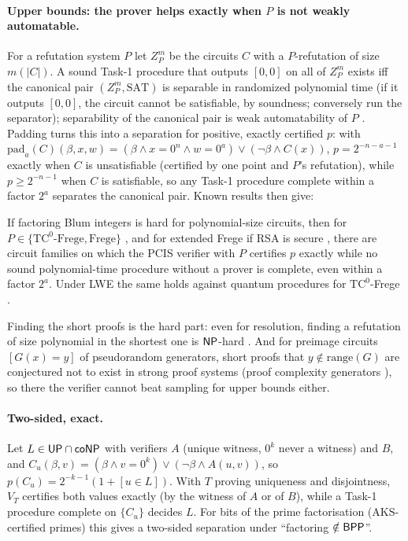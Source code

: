 \paragraph{Upper bounds: the prover helps exactly when $P$ is not weakly
automatable.} For a refutation system $P$ let $Z_P^m$ be the circuits $C$ with
a $P$-refutation of size $m(|C|)$. A sound Task-1 procedure that outputs
$[0,0]$ on all of $Z_P^m$ exists iff the canonical pair $(Z_P^m,\mathrm{SAT})$ is
separable in randomized polynomial time (if it outputs $[0,0]$, the circuit
cannot be satisfiable, by soundness; conversely run the separator); separability of
the canonical pair is weak automatability of $P$ \cite{pudlak2003pairs}. Padding
turns this into a separation for positive, exactly certified $p$: with
$\mathrm{pad}_a(C)(\beta,x,w)=(\beta\wedge x=0^n\wedge w=0^a)\vee(\neg\beta\wedge
C(x))$, $p=2^{-n-a-1}$ exactly when $C$ is unsatisfiable (certified by one point
and $P$'s refutation), while $p\ge2^{-n-1}$ when $C$ is satisfiable, so any Task-1
procedure complete within a factor $2^a$ separates the canonical pair. Known
results then give:

\begin{corollary}\label{cor:automatability}
If factoring Blum integers is hard for polynomial-size circuits, then for
$P\in\{\mathrm{TC}^0\text{-Frege},\text{Frege}\}$ \cite{bpr2000}, and for
extended Frege if RSA is secure \cite{kp1998}, there are circuit families on
which the PCIS verifier with $P$ certifies $p$ exactly while no sound
polynomial-time procedure without a prover is complete, even within a factor
$2^a$. Under LWE the same holds against quantum procedures for
$\mathrm{TC}^0$-Frege \cite{acg2024}.
\end{corollary}

Finding the short proofs is the hard part: even for resolution, finding a
refutation of size polynomial in the shortest one is $\mathsf{NP}$-hard
\cite{atserias2020automating}. And for preimage circuits $[G(x)=y]$ of
pseudorandom generators, short proofs that $y\notin\mathrm{range}(G)$ are
conjectured not to exist in strong proof systems (proof complexity generators
\cite{abrw2004,krajicek2004dual}), so there the verifier cannot beat sampling for
upper bounds either.

\paragraph{Two-sided, exact.} Let $L\in\mathsf{UP}\cap\mathsf{coNP}$ with verifiers $A$
(unique witness, $0^k$ never a witness) and $B$, and
$C_u(\beta,v)=(\beta\wedge v=0^k)\vee(\neg\beta\wedge A(u,v))$, so
$p(C_u)=2^{-k-1}(1+[u\in L])$. With $T$ proving uniqueness and disjointness,
$V_T$ certifies both values exactly (by the witness of $A$ or of $B$), while a
Task-1 procedure complete on $\{C_u\}$ decides $L$. For bits of the
prime factorisation (AKS-certified primes) this gives a two-sided separation
under ``factoring $\notin\mathsf{BPP}$''.

